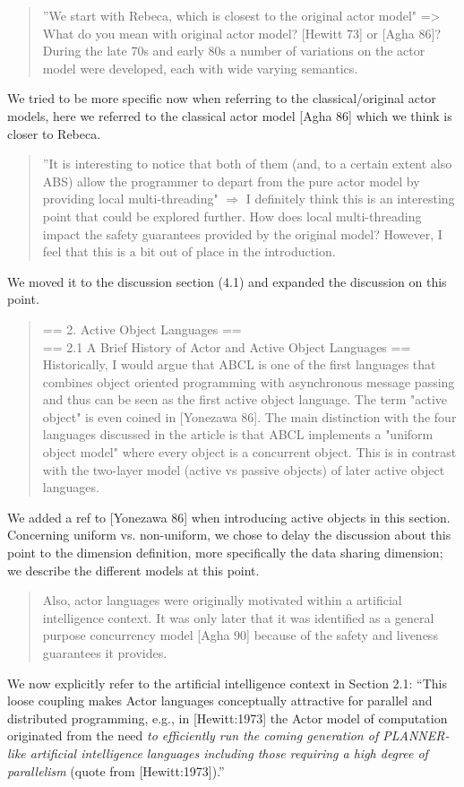 \documentclass{article}
\begin{document}
 \begin{quote}
	”We start with Rebeca, which is closest to the original actor model" => What do you 
mean with original actor model? [Hewitt 73] or [Agha 86]? During the late 70s and early 
80s a number of variations on the actor model were developed, each with wide varying 
semantics.
\end{quote}
We tried to be more specific now when referring to the classical/original actor models, 
here we referred to the classical actor model [Agha 86] which we think is closer to 
Rebeca.

\begin{quote}
	”It is interesting to notice that both of them (and, to a certain extent also ABS) 
allow the programmer to depart from the pure actor model by providing local 
multi-threading" $\Rightarrow$ I definitely think this is an interesting point that could 
be 
explored further. How does local multi-threading impact the safety guarantees provided by 
the original model? However, I feel that this is a bit out of place in the introduction.
\end{quote}
We moved it to the discussion section (4.1) and expanded the discussion on this point.



\begin{quote}
== 2. Active Object Languages ==\\
== 2.1 A Brief History of Actor and Active Object Languages ==\\
	Historically, I would argue that ABCL is one of the first languages that combines 
	object 
oriented programming with asynchronous message passing and thus can be seen as the first 
active object language. The term "active object" is even coined in [Yonezawa 86]. The 
main distinction with the four languages discussed in the article is that ABCL implements 
a "uniform object model" where every object is a concurrent object. This is in contrast 
with the two-layer model (active vs passive objects) of later active object languages.
\end{quote}
 We added a ref to [Yonezawa 86] when introducing active objects in this section.
Concerning uniform vs. non-uniform, we chose to delay the discussion about this point to 
the 
dimension definition, more specifically the data sharing dimension;  we describe the 
different 
models at this point.


\begin{quote}
	Also, actor languages were originally motivated within a artificial intelligence 
	context. 
It was only later that it was identified as a general purpose concurrency model [Agha 90] 
because of the safety and liveness guarantees it provides.
\end{quote}
We now explicitly refer to the artificial intelligence context in Section 2.1:
``This loose coupling makes Actor languages conceptually
attractive for parallel and distributed programming, e.g.,
in  [Hewitt:1973] the Actor model of computation originated from the need \emph{to
	efficiently run the coming generation of PLANNER-like  artificial intelligence 
	languages including those requiring a  high degree of parallelism} (quote from 
	[Hewitt:1973]).''
\end{document}
